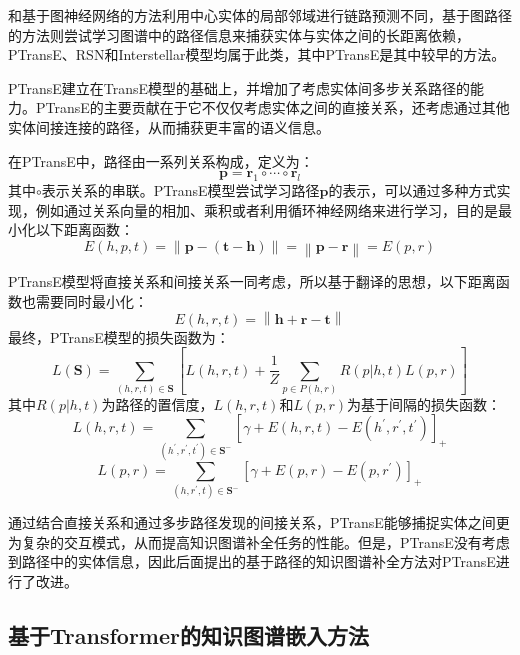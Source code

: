 和基于图神经网络的方法利用中心实体的局部邻域进行链路预测不同，基于图路径的方法则尝试学习图谱中的路径信息来捕获实体与实体之间的长距离依赖，PTransE、RSN和Interstellar模型均属于此类，其中PTransE是其中较早的方法。

PTransE建立在TransE模型的基础上，并增加了考虑实体间多步关系路径的能力。PTransE的主要贡献在于它不仅仅考虑实体之间的直接关系，还考虑通过其他实体间接连接的路径，从而捕获更丰富的语义信息。

在PTransE中，路径由一系列关系构成，定义为：
\begin{equation}
  \mathbf{p} = \mathbf{r}_1\circ \cdots \circ \mathbf{r}_l
\end{equation}
其中$\circ$表示关系的串联。PTransE模型尝试学习路径$\mathbf{p}$的表示，可以通过多种方式实现，例如通过关系向量的相加、乘积或者利用循环神经网络来进行学习，目的是最小化以下距离函数：
\begin{equation}
  E(h,p,t)=\left\lVert \mathbf{p}-(\mathbf{t}-\mathbf{h})\right\rVert =\left\lVert \mathbf{p}-\mathbf{r}\right\rVert=E(p,r) 
\end{equation}

PTransE模型将直接关系和间接关系一同考虑，所以基于翻译的思想，以下距离函数也需要同时最小化：
\begin{equation}
  E(h,r,t)=\left\lVert \mathbf{h}+\mathbf{r}-\mathbf{t}\right\rVert 
\end{equation}
最终，PTransE模型的损失函数为：
\begin{equation}
  L(\mathbf{S})=\sum_{(h,r,t)\in \mathbf{S}}\left[L(h,r,t)+\frac{1}{Z}\sum_{p\in P(h,r)}R(p\vert h,t)L(p,r)\right] 
\end{equation}
其中$R(p\vert h,t)$为路径的置信度，$L(h,r,t)$和$L(p,r)$为基于间隔的损失函数：
\begin{equation}
  L(h,r,t)=\sum_{(h^{'},r^{'},t^{'})\in \mathbf{S}^-}\left[\gamma +E(h,r,t)-E(h^{'},r^{'},t^{'})\right]_+ 
\end{equation}
\begin{equation}
  L(p,r)=\sum_{(h,r^{'},t)\in \mathbf{S}^-}\left[\gamma +E(p,r)-E(p,r^{'})\right]_+
\end{equation}

通过结合直接关系和通过多步路径发现的间接关系，PTransE能够捕捉实体之间更为复杂的交互模式，从而提高知识图谱补全任务的性能。但是，PTransE没有考虑到路径中的实体信息，因此后面提出的基于路径的知识图谱补全方法对PTransE进行了改进。
\subsection{基于Transformer的知识图谱嵌入方法}

